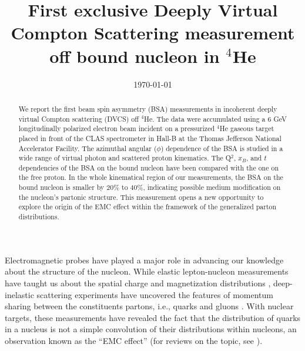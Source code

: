 \documentclass[twocolumn,nofootinbib,showpacs,prl,superscriptaddress,secnumarabic,amssymb,nobibnotes,aps,floatfix]{revtex4}
\begin{document}
\linenumbers

\title{First exclusive Deeply Virtual Compton Scattering measurement off bound nucleon in $^4$He}



\date{\today}
\begin{abstract}
 We report the first beam spin asymmetry (BSA) measurements in incoherent 
   deeply virtual Compton scattering (DVCS) off $^4$He. The data were 
   accumulated using a 6 GeV longitudinally 
   polarized electron beam incident on a pressurized $^4$He gaseous target 
   placed in front of the CLAS spectrometer in Hall-B at the Thomas Jefferson 
   National Accelerator Facility. The azimuthal angular ($\phi$) dependence of 
   the BSA is studied in a wide range of virtual photon and scattered proton 
   kinematics. The Q$^2$, $x_B$, and $t$ dependencies of the BSA on the bound 
   nucleon have been compared with the one on the free proton. In the whole 
   kinematical region of our measurements, the BSA on the bound nucleon is 
   smaller by $20\%$ to $40\%$, indicating possible medium modification 
   on the nucleon's partonic structure. This measurement opens a new 
   opportunity to explore the origin of the EMC effect within the framework of 
   the generalized parton distributions.

\end{abstract}

\maketitle 

Electromagnetic probes have played a major role in advancing our knowledge 
about the structure of the nucleon. While elastic lepton-nucleon measurements have 
taught us about the spatial charge and magnetization distributions 
\cite{Hofstadter:1955ae,Perdrisat:2006hj}, deep-inelastic scattering 
experiments have uncovered the features of momentum sharing between the 
constituents partons, i.e., quarks and gluons \cite{Dokshitzer:1977sg,pdg}.  
With nuclear targets, these measurements have revealed the fact that the 
distribution of quarks in a nucleus is not a simple convolution of 
their distributions within nucleons, an observation known as the ``EMC 
effect''\cite{EMC_first} (for reviews on the topic, see  
\cite{EMC_CERN,EMC_SLAC,EMC_HERMES,EMC_JLab,EMC_John,EMC_mdeium_1,EMC_medium_2}).
\end{document}
